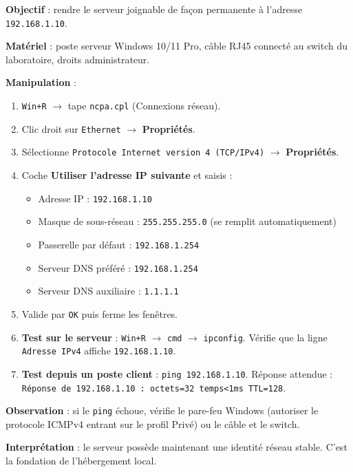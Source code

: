 \documentclass[11pt]{article}
\begin{document}
\begin{experience}
\textbf{Objectif} : rendre le serveur joignable de façon permanente à l'adresse \texttt{192.168.1.10}.

\textbf{Matériel} : poste serveur Windows 10/11 Pro, câble RJ45 connecté au switch du laboratoire, droits administrateur.

\textbf{Manipulation} :
\begin{enumerate}
    \item \texttt{Win+R} $\rightarrow$ tape \texttt{ncpa.cpl} (Connexions réseau).
    \item Clic droit sur \texttt{Ethernet} $\rightarrow$ \textbf{Propriétés}.
    \item Sélectionne \texttt{Protocole Internet version 4 (TCP/IPv4)} $\rightarrow$ \textbf{Propriétés}.
    \item Coche \textbf{Utiliser l'adresse IP suivante} et saisis :
    \begin{itemize}
        \item Adresse IP : \texttt{192.168.1.10}
        \item Masque de sous-réseau : \texttt{255.255.255.0} (se remplit automatiquement)
        \item Passerelle par défaut : \texttt{192.168.1.254}
        \item Serveur DNS préféré : \texttt{192.168.1.254}
        \item Serveur DNS auxiliaire : \texttt{1.1.1.1}
    \end{itemize}
    \item Valide par \texttt{OK} puis ferme les fenêtres.
    \item \textbf{Test sur le serveur} : \texttt{Win+R} $\rightarrow$ \texttt{cmd} $\rightarrow$ \texttt{ipconfig}. Vérifie que la ligne \texttt{Adresse IPv4} affiche \texttt{192.168.1.10}.
    \item \textbf{Test depuis un poste client} : \texttt{ping 192.168.1.10}. Réponse attendue : \texttt{Réponse de 192.168.1.10 : octets=32 temps<1ms TTL=128}.
\end{enumerate}
\textbf{Observation} : si le \texttt{ping} échoue, vérifie le pare-feu Windows (autoriser le protocole ICMPv4 entrant sur le profil Privé) ou le câble et le switch.

\textbf{Interprétation} : le serveur possède maintenant une identité réseau stable. C'est la fondation de l'hébergement local.
\end{experience}
\end{document}
